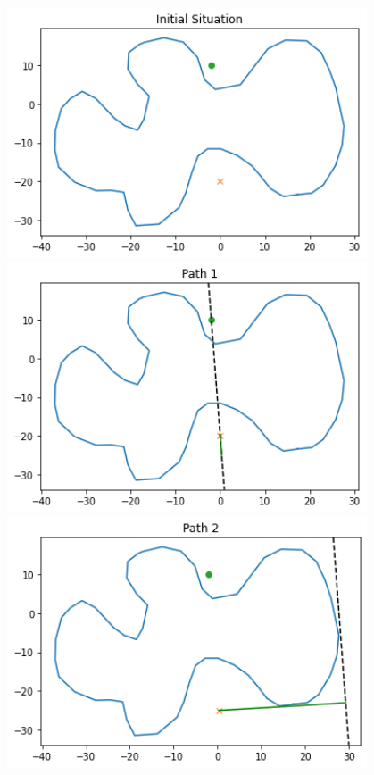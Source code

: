 \documentclass[11pt,landscape]{article}
\begin{document}
\newpage
\begin{figure}[H]
    \begin{mdframed}
        \begin{center}
            \begin{minipage}{0.3\textwidth}
                \includegraphics[width=0.95\textwidth]{initial.png}
            \end{minipage}
            \begin{minipage}{0.3\textwidth}
                \includegraphics[width=0.95\textwidth]{p1.png}
            \end{minipage}
            \begin{minipage}{0.3\textwidth}
                \includegraphics[width=0.95\textwidth]{p2.png}

\end{minipage}
\end{center}
\end{mdframed}
\end{figure}
\end{document}
